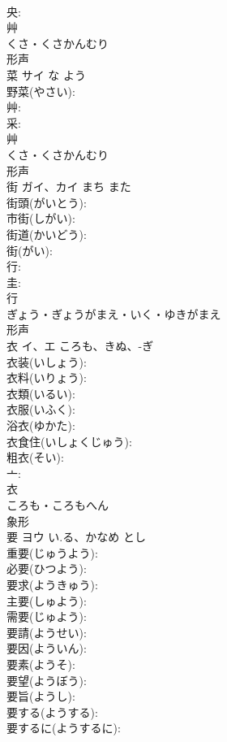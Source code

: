 \documentclass[8pt]{extreport}
\begin{document}
\begin{CJK}{UTF8}{min}
\\	央: 
\\	艸	
\\	くさ・くさかんむり	
\\	形声 
\\	菜	サイ	な	よう	
\\	野菜(やさい): 
\\	艸: 
\\	采: 
\\	艸	
\\	くさ・くさかんむり	
\\	形声 
\\	街	ガイ、カイ	まち	また	
\\	街頭(がいとう): 
\\	市街(しがい): 
\\	街道(かいどう): 
\\	街(がい): 
\\	行: 
\\	圭: 
\\	行	
\\	ぎょう・ぎょうがまえ・いく・ゆきがまえ	
\\	形声 
\\	衣	イ、エ	ころも、きぬ、-ぎ		
\\	衣装(いしょう): 
\\	衣料(いりょう): 
\\	衣類(いるい): 
\\	衣服(いふく): 
\\	浴衣(ゆかた): 
\\	衣食住(いしょくじゅう): 
\\	粗衣(そい): 
\\	亠: 
\\	衣	
\\	ころも・ころもへん	
\\	象形 
\\	要	ヨウ	い.る、かなめ	とし	
\\	重要(じゅうよう): 
\\	必要(ひつよう): 
\\	要求(ようきゅう): 
\\	主要(しゅよう): 
\\	需要(じゅよう): 
\\	要請(ようせい): 
\\	要因(よういん): 
\\	要素(ようそ): 
\\	要望(ようぼう): 
\\	要旨(ようし): 
\\	要する(ようする): 
\\	要するに(ようするに): 

\end{CJK}
\end{document}
